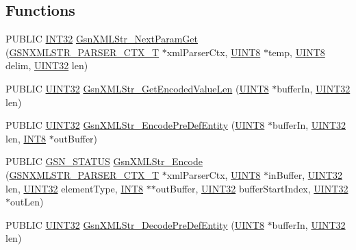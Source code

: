 \subsection*{Functions}
\begin{DoxyCompactItemize}
\item 
PUBLIC \hyperlink{a00660_ga63021d67d54286c2163bcdb43a6f2569}{INT32} \hyperlink{a00617_a2d31e461655d523bdd8a4399b7f207e5}{GsnXMLStr\_\-NextParamGet} (\hyperlink{a00444}{GSNXMLSTR\_\-PARSER\_\-CTX\_\-T} $\ast$xmlParserCtx, \hyperlink{a00660_gab27e9918b538ce9d8ca692479b375b6a}{UINT8} $\ast$temp, \hyperlink{a00660_gab27e9918b538ce9d8ca692479b375b6a}{UINT8} delim, \hyperlink{a00660_gae1e6edbbc26d6fbc71a90190d0266018}{UINT32} len)
\item 
PUBLIC \hyperlink{a00660_gae1e6edbbc26d6fbc71a90190d0266018}{UINT32} \hyperlink{a00617_a7f6558008e57dea5c4418cdee7e84503}{GsnXMLStr\_\-GetEncodedValueLen} (\hyperlink{a00660_gab27e9918b538ce9d8ca692479b375b6a}{UINT8} $\ast$bufferIn, \hyperlink{a00660_gae1e6edbbc26d6fbc71a90190d0266018}{UINT32} len)
\item 
PUBLIC \hyperlink{a00660_gae1e6edbbc26d6fbc71a90190d0266018}{UINT32} \hyperlink{a00617_acd552e3e011cf08bae991192c7221f67}{GsnXMLStr\_\-EncodePreDefEntity} (\hyperlink{a00660_gab27e9918b538ce9d8ca692479b375b6a}{UINT8} $\ast$bufferIn, \hyperlink{a00660_gae1e6edbbc26d6fbc71a90190d0266018}{UINT32} len, \hyperlink{a00660_ga307b8734c020247f6bac4fcde0dcfbb9}{INT8} $\ast$outBuffer)
\item 
PUBLIC \hyperlink{a00660_gada5951904ac6110b1fa95e51a9ddc217}{GSN\_\-STATUS} \hyperlink{a00617_ae804f6424bca99195646dbaecb7c811f}{GsnXMLStr\_\-Encode} (\hyperlink{a00444}{GSNXMLSTR\_\-PARSER\_\-CTX\_\-T} $\ast$xmlParserCtx, \hyperlink{a00660_gab27e9918b538ce9d8ca692479b375b6a}{UINT8} $\ast$inBuffer, \hyperlink{a00660_gae1e6edbbc26d6fbc71a90190d0266018}{UINT32} len, \hyperlink{a00660_gae1e6edbbc26d6fbc71a90190d0266018}{UINT32} elementType, \hyperlink{a00660_ga307b8734c020247f6bac4fcde0dcfbb9}{INT8} $\ast$$\ast$outBuffer, \hyperlink{a00660_gae1e6edbbc26d6fbc71a90190d0266018}{UINT32} bufferStartIndex, \hyperlink{a00660_gae1e6edbbc26d6fbc71a90190d0266018}{UINT32} $\ast$outLen)
\item 
PUBLIC \hyperlink{a00660_gae1e6edbbc26d6fbc71a90190d0266018}{UINT32} \hyperlink{a00617_a7663137be07a9ffcf34a5c58f04b2520}{GsnXMLStr\_\-DecodePreDefEntity} (\hyperlink{a00660_gab27e9918b538ce9d8ca692479b375b6a}{UINT8} $\ast$bufferIn, \hyperlink{a00660_gae1e6edbbc26d6fbc71a90190d0266018}{UINT32} len)
\item 
$$
\end{DoxyCompactItemize}
